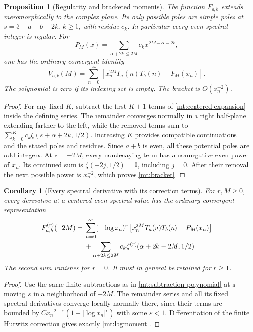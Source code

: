 \documentclass[11pt,letterpaper]{article}
\numberwithin{equation}{section}
\theoremstyle{plain}
\newtheorem{proposition}[theorem]{Proposition}
\newtheorem{corollary}[theorem]{Corollary}
\theoremstyle{definition}
\theoremstyle{remark}
\begin{document}
\begin{proposition}[Regularity and bracketed moments]
\label{mt:regularity}
The function $F_{a,b}$ extends meromorphically to the complex plane.
Its only possible poles are simple poles at
$s=3-a-b-2k$, $k\ge0$, with residue $c_k$.
In particular every even spectral integer is regular. For
\begin{equation}\label{mt:subtraction-polynomial}
 P_M(x)=\sum_{\alpha+2k\le2M}c_kx^{2M-\alpha-2k},
\end{equation}
one has the ordinary convergent identity
\begin{equation}\label{mt:bracket}
 V_{a,b}(M)=\sum_{n=0}^{\infty}
 \left[x_n^{2M}T_a(n)T_b(n)-P_M(x_n)\right].
\end{equation}
The polynomial is zero if its indexing set is empty. The bracket is
$O(x_n^{-2})$.
\end{proposition}

\begin{proof}
For any fixed $K$, subtract the first $K+1$ terms of
\eqref{mt:centered-expansion} inside the defining series. The remainder
converges normally in a right half-plane extending farther to the left,
while the removed terms
sum to
$\sum_{k=0}^K c_k\zeta(s+\alpha+2k,1/2)$.
Increasing $K$ provides compatible continuations and the stated poles
and residues. Since $a+b$ is even, all these potential poles are odd
integers. At $s=-2M$, every nondecaying term has a nonnegative even
power of $x_n$. Its continued sum is
$\zeta(-2j,1/2)=0$, including $j=0$. After their removal the next
possible power is $x_n^{-2}$, which proves \eqref{mt:bracket}.
\end{proof}

\begin{corollary}[Every spectral derivative with its correction terms]
\label{mt:spectralderivatives}
For $r,M\geq0$, every derivative at a centered even spectral value has
the ordinary convergent representation
\begin{align}
 F_{a,b}^{(r)}(-2M)
  ={}&\sum_{n=0}^{\infty}(-\log x_n)^r
       \left[x_n^{2M}T_a(n)T_b(n)-P_M(x_n)\right]\notag\\
    &+\sum_{\alpha+2k\leq2M}
               c_k\zeta^{(r)}(\alpha+2k-2M,1/2).
 \label{mt:logmoment}
\end{align}
The second sum vanishes for $r=0$. It must in general be retained for
$r\geq1$.
\end{corollary}
\begin{proof}
Use the same finite subtractions as in \eqref{mt:subtraction-polynomial}
at a moving $s$ in a neighborhood of $-2M$. The remainder series and all
its fixed spectral derivatives converge locally normally there, since
their terms are bounded by $C x_n^{-2+\varepsilon}(1+|\log x_n|^r)$
with some $\varepsilon<1$. Differentiation of the finite Hurwitz
correction gives exactly \eqref{mt:logmoment}.
\end{proof}
\end{document}
